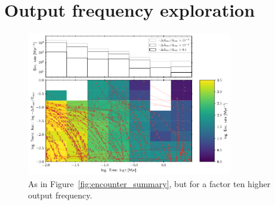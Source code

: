 \documentclass{aa}
\begin{document}
\section{Output frequency exploration}
\label{app:output_freq}
\begin{figure}
    \centering
    \includegraphics[width=0.8\textwidth]{Figures/encounter_summary_mRrel_highfreq.pdf}
    \caption{As in Figure~\ref{fig:encounter_summary}, but for a factor ten higher output frequency.}
    \label{fig:encsumm_hf}
\end{figure}
\end{document}
